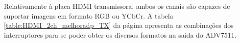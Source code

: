 Relativamente à placa HDMI transmissora, ambos os canais são capazes de suportar imagens em formato RGB ou YCbCr. A tabela \ref{table:HDMI_2ch_melhoradp_TX} da página \pageref{table:HDMI_2ch_melhoradp_TX} apresenta as combinações dos interruptores para se poder obter os diversos formatos na saída do ADV7511.

